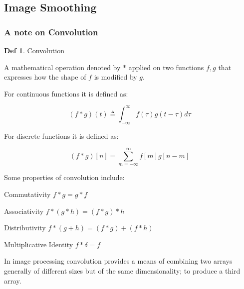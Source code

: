\documentclass{article}
\theoremstyle{definition}
\newtheorem{df}{Def}
\theoremstyle{remark}
\begin{document}
\break


\subsection{Image Smoothing}


\subsubsection{A note on Convolution}

\begin{df}Convolution

A mathematical operation denoted by $ * $ applied on two functions $ f, g $ that expresses how the shape of $ f $ is modified by $ g $.

\end{df}

\noindent For continuous functions it is defined as:

\begin{equation}
    (f * g)(t) \triangleq \int_{-\infty}^{\infty} f(\tau)g(t - \tau) d\tau
\end{equation}

\noindent For discrete functions it is defined as:

\begin{equation}
    (f * g)[n] = \sum_{m=-\infty}^{\infty}f[m]g[n -m]
\end{equation}

\noindent Some properties of convolution include:\\
\begin{description}
    \item Commutativity $ f * g = g * f $

    \item Associativity $ f * (g * h) = (f * g) * h $

    \item Distributivity $ f * (g + h) = (f * g) + (f * h) $

    \item Multiplicative Identity $ f * \delta = f $
\end{description}

\hfill

\noindent In image processing convolution provides a means of combining two arrays generally of different sizes but of the same dimensionality; to produce a third array.
\end{document}
